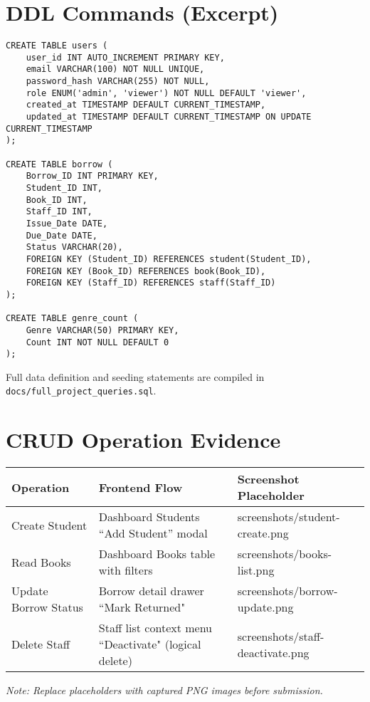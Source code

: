 \documentclass[12pt]{article}
\begin{document}
\section{DDL Commands (Excerpt)}
\begin{lstlisting}[style=sqlstyle,caption={Core schema definitions}]
CREATE TABLE users (
    user_id INT AUTO_INCREMENT PRIMARY KEY,
    email VARCHAR(100) NOT NULL UNIQUE,
    password_hash VARCHAR(255) NOT NULL,
    role ENUM('admin', 'viewer') NOT NULL DEFAULT 'viewer',
    created_at TIMESTAMP DEFAULT CURRENT_TIMESTAMP,
    updated_at TIMESTAMP DEFAULT CURRENT_TIMESTAMP ON UPDATE CURRENT_TIMESTAMP
);

CREATE TABLE borrow (
    Borrow_ID INT PRIMARY KEY,
    Student_ID INT,
    Book_ID INT,
    Staff_ID INT,
    Issue_Date DATE,
    Due_Date DATE,
    Status VARCHAR(20),
    FOREIGN KEY (Student_ID) REFERENCES student(Student_ID),
    FOREIGN KEY (Book_ID) REFERENCES book(Book_ID),
    FOREIGN KEY (Staff_ID) REFERENCES staff(Staff_ID)
);

CREATE TABLE genre_count (
    Genre VARCHAR(50) PRIMARY KEY,
    Count INT NOT NULL DEFAULT 0
);
\end{lstlisting}
Full data definition and seeding statements are compiled in \texttt{docs/full\_project\_queries.sql}.

\section{CRUD Operation Evidence}
\begin{longtable}{@{}L{0.25\textwidth}L{0.38\textwidth}L{0.29\textwidth}@{}}
\toprule
Operation & Frontend Flow & Screenshot Placeholder \\
\midrule
Create Student & Dashboard \textrightarrow{} Students \textrightarrow{} ``Add Student'' modal & screenshots/student-create.png \\
Read Books & Dashboard \textrightarrow{} Books table with filters & screenshots/books-list.png \\
Update Borrow Status & Borrow detail drawer \textrightarrow{} ``Mark Returned" & screenshots/borrow-update.png \\
Delete Staff & Staff list \textrightarrow{} context menu \textrightarrow{} ``Deactivate" (logical delete) & screenshots/staff-deactivate.png \\
\bottomrule
\end{longtable}
\textit{Note: Replace placeholders with captured PNG images before submission.}
\end{document}
